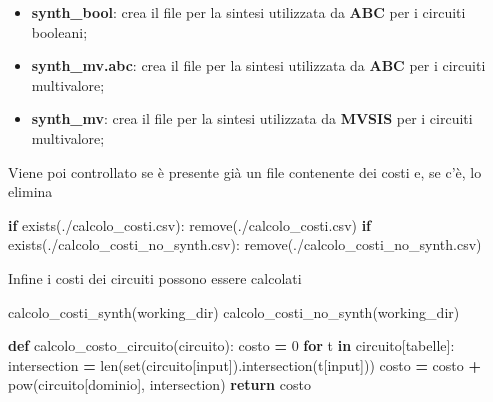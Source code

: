 \documentclass[
]{book}
\newenvironment{Shaded}{\begin{snugshade}}{\end{snugshade}}
\newcommand{\BuiltInTok}[1]{#1}
\newcommand{\ControlFlowTok}[1]{\textcolor[rgb]{0.13,0.29,0.53}{\textbf{#1}}}
\newcommand{\DecValTok}[1]{\textcolor[rgb]{0.00,0.00,0.81}{#1}}
\newcommand{\KeywordTok}[1]{\textcolor[rgb]{0.13,0.29,0.53}{\textbf{#1}}}
\newcommand{\NormalTok}[1]{#1}
\newcommand{\OperatorTok}[1]{\textcolor[rgb]{0.81,0.36,0.00}{\textbf{#1}}}
\newcommand{\StringTok}[1]{\textcolor[rgb]{0.31,0.60,0.02}{#1}}
\providecommand{\tightlist}{%
  \setlength{\itemsep}{0pt}\setlength{\parskip}{0pt}}
\begin{document}
\begin{itemize}
\tightlist
\item
  \textbf{synth\_bool}: crea il file per la sintesi utilizzata da \textbf{ABC} per i circuiti booleani;
\item
  \textbf{synth\_mv.abc}: crea il file per la sintesi utilizzata da \textbf{ABC} per i circuiti multivalore;
\item
  \textbf{synth\_mv}: crea il file per la sintesi utilizzata da \textbf{MVSIS} per i circuiti multivalore;
\end{itemize}

\newpage

Viene poi controllato se è presente già un file contenente dei costi e, se c'è, lo elimina

\begin{Shaded}
\begin{Highlighting}[]
\ControlFlowTok{if}\NormalTok{ exists(}\StringTok{\textquotesingle{}./calcolo\_costi.csv\textquotesingle{}}\NormalTok{):}
\NormalTok{    remove(}\StringTok{\textquotesingle{}./calcolo\_costi.csv\textquotesingle{}}\NormalTok{)}
\ControlFlowTok{if}\NormalTok{ exists(}\StringTok{\textquotesingle{}./calcolo\_costi\_no\_synth.csv\textquotesingle{}}\NormalTok{):}
\NormalTok{    remove(}\StringTok{\textquotesingle{}./calcolo\_costi\_no\_synth.csv\textquotesingle{}}\NormalTok{)}
\end{Highlighting}
\end{Shaded}

Infine i costi dei circuiti possono essere calcolati

\begin{Shaded}
\begin{Highlighting}[]
\NormalTok{calcolo\_costi\_synth(working\_dir)}
\NormalTok{calcolo\_costi\_no\_synth(working\_dir)}

\KeywordTok{def}\NormalTok{ calcolo\_costo\_circuito(circuito):}
\NormalTok{  costo }\OperatorTok{=} \DecValTok{0}
  \ControlFlowTok{for}\NormalTok{ t }\KeywordTok{in}\NormalTok{ circuito[}\StringTok{\textquotesingle{}tabelle\textquotesingle{}}\NormalTok{]:}
\NormalTok{    intersection }\OperatorTok{=} \BuiltInTok{len}\NormalTok{(}\BuiltInTok{set}\NormalTok{(circuito[}\StringTok{\textquotesingle{}input\textquotesingle{}}\NormalTok{]).intersection(t[}\StringTok{\textquotesingle{}input\textquotesingle{}}\NormalTok{]))}
\NormalTok{    costo }\OperatorTok{=}\NormalTok{ costo }\OperatorTok{+} \BuiltInTok{pow}\NormalTok{(circuito[}\StringTok{\textquotesingle{}dominio\textquotesingle{}}\NormalTok{], intersection)}
  \ControlFlowTok{return}\NormalTok{ costo}
\end{Highlighting}
\end{Shaded}
\end{document}
